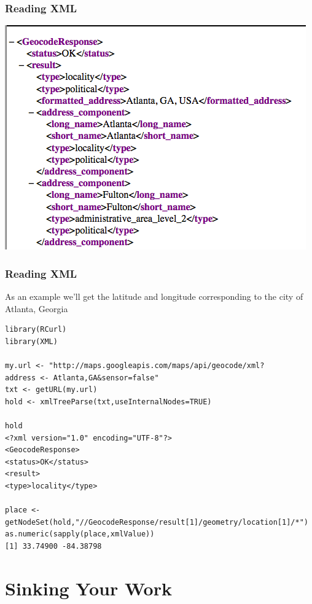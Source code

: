 \documentclass{beamer}
\begin{document}
\begin{frame}[fragile]
\frametitle{Reading XML}
\begin{center} 
\includegraphics{../IMG/xml.png}
\end{center}
\end{frame}

\begin{frame}[fragile]
\frametitle{Reading XML}
As an example we'll get the latitude and longitude corresponding to the city of Atlanta, Georgia 
\scriptsize
\begin{verbatim}
library(RCurl)
library(XML)

my.url <- "http://maps.googleapis.com/maps/api/geocode/xml?
address <- Atlanta,GA&sensor=false"
txt <- getURL(my.url)
hold <- xmlTreeParse(txt,useInternalNodes=TRUE)

hold
<?xml version="1.0" encoding="UTF-8"?>
<GeocodeResponse>
<status>OK</status>
<result>
<type>locality</type>

place <- getNodeSet(hold,"//GeocodeResponse/result[1]/geometry/location[1]/*")
as.numeric(sapply(place,xmlValue))
[1] 33.74900 -84.38798
\end{verbatim}
\end{frame}



\section{Sinking Your Work}
\end{document}
